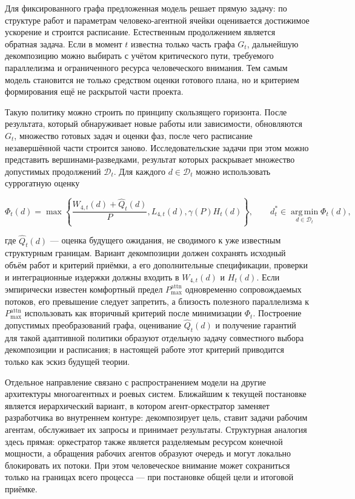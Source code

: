 Для фиксированного графа предложенная модель решает прямую задачу: по
структуре работ и параметрам человеко-агентной ячейки оценивается
достижимое ускорение и строится расписание. Естественным продолжением
является обратная задача. Если в момент $t$ известна только часть графа
$G_t$, дальнейшую декомпозицию можно выбирать с учётом критического пути,
требуемого параллелизма и ограниченного ресурса человеческого внимания.
Тем самым модель становится не только средством оценки готового плана,
но и критерием формирования ещё не раскрытой части проекта.

Такую политику можно строить по принципу скользящего горизонта. После
результата, который обнаруживает новые работы или зависимости, обновляются
$G_t$, множество готовых задач и оценки фаз, после чего расписание незавершённой
части строится заново. Исследовательские задачи при этом можно представить
вершинами-разведками, результат которых раскрывает множество допустимых
продолжений $\mathcal D_t$. Для каждого $d\in\mathcal D_t$ можно использовать суррогатную оценку

\[
\Phi_t(d)=
\max\left\{
\frac{W_{4,t}(d)+\widehat Q_t(d)}{P},
L_{4,t}(d),
\gamma(P)H_t(d)
\right\},
\qquad
d_t^*\in\operatorname*{arg\,min}_{d\in\mathcal D_t}\Phi_t(d),
\]

где $\widehat Q_t(d)$ --- оценка будущего ожидания, не сводимого к уже известным
структурным границам. Вариант декомпозиции должен сохранять исходный объём
работ и критерий приёмки, а его дополнительные спецификации, проверки и интеграционные
издержки должны входить в $W_{4,t}(d)$ и $H_t(d)$. Если эмпирически известен
комфортный предел $P_{\max}^{\mathrm{attn}}$ одновременно сопровождаемых потоков, его превышение следует
запретить, а близость полезного параллелизма к $P_{\max}^{\mathrm{attn}}$ использовать как вторичный критерий
после минимизации $\Phi_t$. Построение допустимых преобразований графа, оценивание
$\widehat Q_t(d)$ и получение гарантий для такой адаптивной политики образуют отдельную задачу
совместного выбора декомпозиции и расписания; в настоящей работе этот критерий
приводится только как эскиз будущей теории.

Отдельное направление связано с распространением модели на другие архитектуры
многоагентных и роевых систем. Ближайшим к текущей постановке является
иерархический вариант, в котором агент-оркестратор заменяет разработчика во
внутреннем контуре: декомпозирует цель, ставит задачи рабочим агентам,
обслуживает их запросы и принимает результаты. Структурная аналогия здесь прямая:
оркестратор также является разделяемым ресурсом конечной мощности, а обращения
рабочих агентов образуют очередь и могут локально блокировать их потоки. При этом
человеческое внимание может сохраниться только на границах всего процесса --- при
постановке общей цели и итоговой приёмке.

